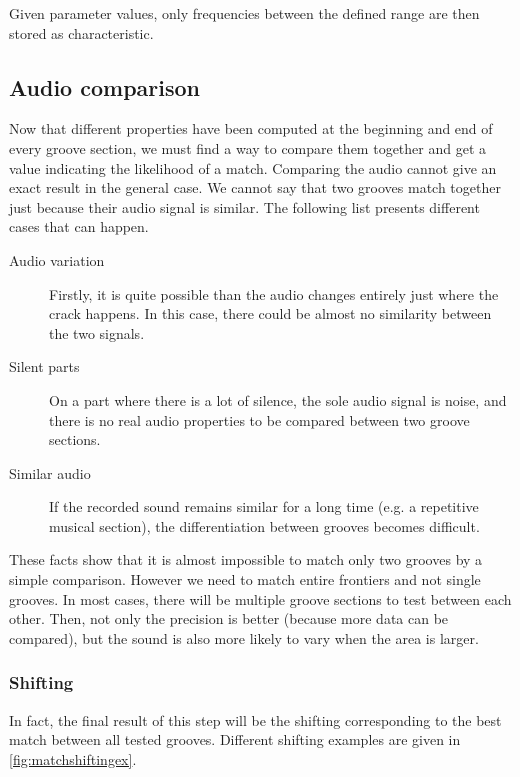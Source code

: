 Given parameter values, only frequencies between the defined range are then stored as characteristic.

\subsection{Audio comparison}
Now that different properties have been computed at the beginning and end of every groove section, we must find a way to compare them together and get a value indicating the likelihood of a match. Comparing the audio cannot give an exact result in the general case. We cannot say that two grooves match together just because their audio signal is similar. The following list presents different cases that can happen.

\begin{description}
\item[Audio variation] Firstly, it is quite possible than the audio changes entirely just where the crack happens. In this case, there could be almost no similarity between the two signals.
\item[Silent parts] On a part where there is a lot of silence, the sole audio signal is noise, and there is no real audio properties to be compared between two groove sections.
\item[Similar audio] If the recorded sound remains similar for a long time (e.g. a repetitive musical section), the differentiation between grooves becomes difficult.
\end{description}

These facts show that it is almost impossible to match only two grooves by a simple comparison. However we need to match entire frontiers and not single grooves. In most cases, there will be multiple groove sections to test between each other. Then, not only the precision is better (because more data can be compared), but the sound is also more likely to vary when the area is larger.

\subsubsection{Shifting}

In fact, the final result of this step will be the shifting corresponding to the best match between all tested grooves. Different shifting examples are given in \autoref{fig:matchshiftingex}.

